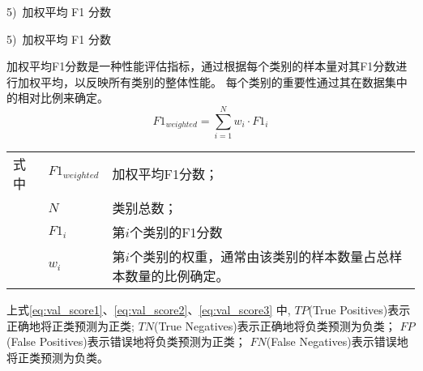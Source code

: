 5)~加权平均 F1 分数\par
5)~加权平均 F1 分数\par
加权平均F1分数是一种性能评估指标，通过根据每个类别的样本量对其F1分数进行加权平均，以反映所有类别的整体性能。
每个类别的重要性通过其在数据集中的相对比例来确定。
\begin{equation}
	\label{eq:val_score5}
	F1_{weighted} = \sum\limits_{i=1}^{N} w_i \cdot F1_i
\end{equation}
\begin{flushleft}
	\renewcommand\arraystretch{1.25}
	\begin{tabularx}{\textwidth}{@{}>{\normalsize\rm}l@{\quad}>{\normalsize\rm}l@{——}>{\normalsize\rm}X@{}}
		式中 & $F1_{weighted}$ & 加权平均F1分数；                                                  \\
		     & $N$             & 类别总数；                                                        \\
		     & $F1_i$          & 第$i$个类别的F1分数                                               \\
		     & $w_i$           & 第$i$个类别的权重，通常由该类别的样本数量占总样本数量的比例确定。 \\
	\end{tabularx}\vspace{.5ex}
\end{flushleft}

上式\ref{eq:val_score1}、\ref{eq:val_score2}、\ref{eq:val_score3}%
中,
$TP$(True Positives)表示正确地将正类预测为正类;
$TN$(True Negatives)表示正确地将负类预测为负类；
$FP$(False Positives)表示错误地将负类预测为正类；
$FN$(False Negatives)表示错误地将正类预测为负类。

